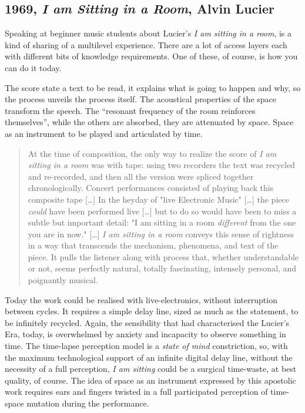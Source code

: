 \documentclass[twoside,a4paper]{article}
\begin{document}

\subsection{1969, \emph{I am Sitting in a Room}, Alvin Lucier}

Speaking at beginner music students about Lucier's \emph{I am sitting in a room}, is a kind of sharing of a multilevel experience. There are a lot of access layers each with different bits of knowledge requirements. One of these, of course, is how you can do it today. 

The score state a text to be read, it explains what is going to happen and why, so the process unveils the process itself. The acoustical properties of the space transform the speech. The “resonant frequency of the room reinforces themselves”, while the others are absorbed, they are attenuated by space. Space as an instrument to be played and articulated by time. 

\begin{quote}
At the time of composition, the only way to realize the score of \emph{I am sitting in a room} was with tape: using two recorders the text was recycled and re-recorded, and then all the version were spliced together chronologically. Concert performances consisted of playing back this composite tape [\ldots] In the heyday of "live Electronic Music" [\ldots] the piece \emph{could} have been performed live [\ldots] but to do so would have been to miss a subtle but important detail: "I am sitting in a room \emph{different} from the one you are in now." [\ldots] \emph{I am sitting in a room} conveys this sense of rightness in a way that transcends the mechanism, phenomena, and text of the piece. It pulls the listener along with process that, whether understandable or not, seems perfectly natural, totally fascinating, intensely personal, and poignantly musical. \cite{alCD90} 
\end{quote}

Today the work could be realised with live-electronics, without interruption between cycles. It requires a simple delay line, sized as much as the statement, to be infinitely recycled. Again, the sensibility that had characterised the Lucier's Era, today, is overwhelmed by anxiety and incapacity to observe something in time. The time-lapse perception model is a \emph{state of mind} constriction, so, with the maximum technological support of an infinite digital delay line, without the necessity of a full perception, \emph{I am sitting} could be a surgical time-waste, at best quality, of course. The idea of space as an instrument expressed by this apostolic work requires ears and fingers twisted in a full participated perception of time-space mutation during the performance. 
\end{document}
